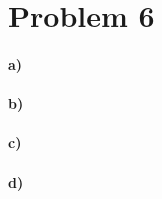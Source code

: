 \documentclass[12pt]{article}
\begin{document}
\section*{Problem 6}

\paragraph{a)}

\paragraph{b)}

\paragraph{c)}

\paragraph{d)}
\end{document}
